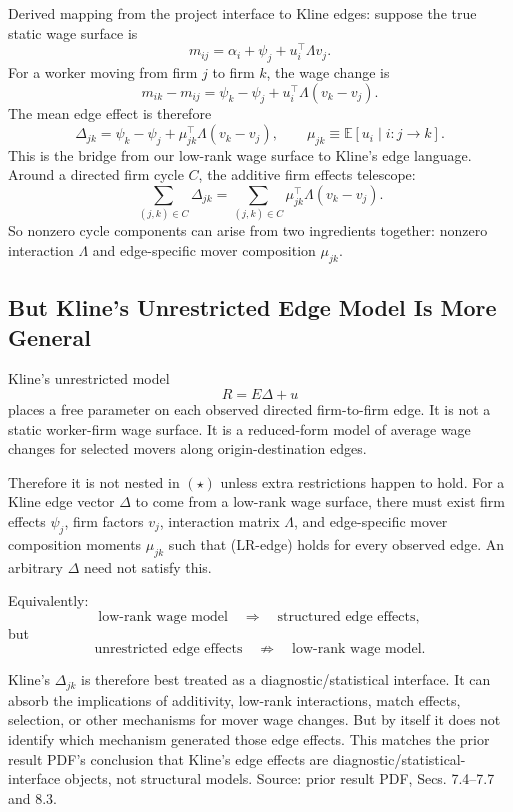 \documentclass[11pt]{article}
\newcommand{\E}{\mathbb{E}}
\begin{document}
Derived mapping from the project interface to Kline edges: suppose the true static wage surface is
\[
m_{ij}=\alpha_i+\psi_j+u_i^\top\Lambda v_j.
\]
For a worker moving from firm $j$ to firm $k$, the wage change is
\[
m_{ik}-m_{ij}
=
\psi_k-\psi_j+u_i^\top\Lambda(v_k-v_j).
\]
The mean edge effect is therefore
\[
\Delta_{jk}
=
\psi_k-\psi_j+\mu_{jk}^\top\Lambda(v_k-v_j),
\qquad
\mu_{jk}\equiv \E[u_i\mid i:j\to k].
\tag{LR-edge}
\]
This is the bridge from our low-rank wage surface to Kline's edge language. Around
a directed firm cycle $C$, the additive firm effects telescope:
\[
\sum_{(j,k)\in C}\Delta_{jk}
=
\sum_{(j,k)\in C}\mu_{jk}^\top\Lambda(v_k-v_j).
\]
So nonzero cycle components can arise from two ingredients together: nonzero
interaction $\Lambda$ and edge-specific mover composition $\mu_{jk}$.

\subsection{But Kline's Unrestricted Edge Model Is More General}

Kline's unrestricted model
\[
R=E\Delta+u
\]
places a free parameter on each observed directed firm-to-firm edge. It is not a
static worker-firm wage surface. It is a reduced-form model of average wage changes
for selected movers along origin-destination edges.

Therefore it is not nested in $(\star)$ unless extra restrictions happen to hold.
For a Kline edge vector $\Delta$ to come from a low-rank wage surface, there must
exist firm effects $\psi_j$, firm factors $v_j$, interaction matrix $\Lambda$, and
edge-specific mover composition moments $\mu_{jk}$ such that (LR-edge) holds for
every observed edge. An arbitrary $\Delta$ need not satisfy this.

Equivalently:
\[
\text{low-rank wage model}
\quad\Rightarrow\quad
\text{structured edge effects},
\]
but
\[
\text{unrestricted edge effects}
\quad\not\Rightarrow\quad
\text{low-rank wage model}.
\]

Kline's $\Delta_{jk}$ is therefore best treated as a diagnostic/statistical interface.
It can absorb the implications of additivity, low-rank interactions, match effects,
selection, or other mechanisms for mover wage changes. But by itself it does not
identify which mechanism generated those edge effects. This matches the prior
result PDF's conclusion that Kline's edge effects are diagnostic/statistical-interface
objects, not structural models. Source: prior result PDF, Secs. 7.4--7.7 and 8.3.
\end{document}
